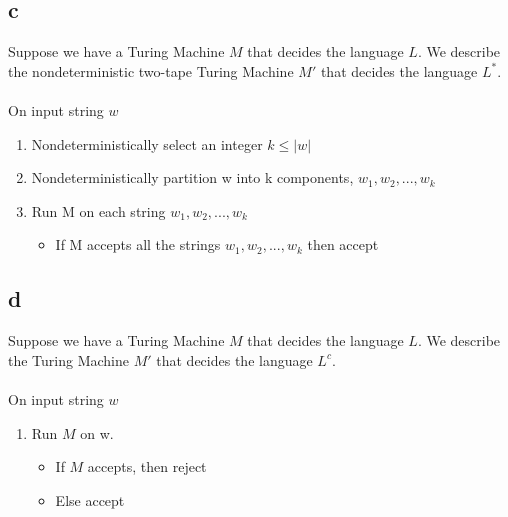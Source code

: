 \documentclass{article}
\begin{document}
\subsection*{c}
Suppose we have a Turing Machine $M$ that decides the language $L$. We describe the nondeterministic two-tape Turing Machine $M'$ that decides the language $L^*$.\\\\
On input string $w$
\begin{enumerate}
    \item Nondeterministically select an integer $k \leq |w| $
    \item Nondeterministically partition w into k components, $w_1, w_2, ..., w_k$
    \item Run M on each string $w_1, w_2, ..., w_k$
        \begin {itemize}
        		\item If M accepts all the strings $w_1, w_2, ..., w_k$ then accept
        \end{itemize}
\end{enumerate}

\subsection*{d}
Suppose we have a Turing Machine $M$ that decides the language $L$. We describe the Turing Machine $M'$ that decides the language $L^c$.\\\\
On input string $w$
\begin{enumerate}
    \item Run $M$ on w. 
    \begin{itemize}
        \item If $M$ accepts, then reject
        \item Else accept
    \end{itemize}
\end{enumerate}
\end{document}

